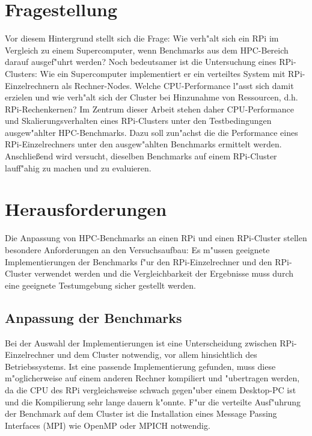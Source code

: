 \section{Fragestellung}\label{Fragestellung}

Vor diesem Hintergrund stellt sich die Frage: Wie verh"alt sich ein RPi im Vergleich zu einem Supercomputer, wenn Benchmarks aus dem HPC-Bereich darauf ausgef"uhrt werden? Noch bedeutsamer ist die Untersuchung eines RPi-Clusters: Wie ein Supercomputer implementiert er ein verteiltes System mit RPi-Einzelrechnern als Rechner-Nodes. Welche CPU-Performance l"asst sich damit erzielen und wie verh"alt sich der Cluster bei Hinzunahme von Ressourcen, d.h. RPi-Rechenkernen? Im Zentrum dieser Arbeit stehen daher CPU-Performance und Skalierungsverhalten eines RPi-Clusters unter den Testbedingungen ausgew"ahlter HPC-Benchmarks. Dazu soll zun"achst die die Performance eines RPi-Einzelrechners unter den ausgew"ahlten Benchmarks ermittelt werden. Anschlie\ss end wird versucht, dieselben Benchmarks auf einem RPi-Cluster lauff"ahig zu machen und zu evaluieren. 

\section{Herausforderungen}\label{Herausforderungen}

Die Anpassung von HPC-Benchmarks an einen RPi und einen RPi-Cluster stellen besondere Anforderungen an den Versuchsaufbau: Es m"ussen geeignete Implementierungen der Benchmarks f"ur den RPi-Einzelrechner und den RPi-Cluster verwendet werden und die Vergleichbarkeit der Ergebnisse muss durch eine geeignete Testumgebung sicher gestellt werden.  

\subsection{Anpassung der Benchmarks}\label{Anpassung}

Bei der Auswahl der Implementierungen ist eine Unterscheidung zwischen RPi-Einzelrechner und dem Cluster notwendig, vor allem hinsichtlich des Betriebssystems. Ist eine passende Implementierung gefunden, muss diese m"oglicherweise auf einem anderen Rechner kompiliert und "ubertragen werden, da die CPU des RPi vergleichsweise schwach gegen"uber einem Desktop-PC ist und die Kompilierung sehr lange dauern k"onnte. F"ur die verteilte Ausf"uhrung der Benchmark auf dem Cluster ist die Installation eines Message Passing Interfaces (MPI) wie OpenMP oder MPICH notwendig. 

